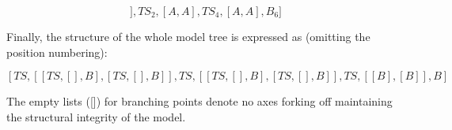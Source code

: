 \begin{equation}
[TS_0,[[A,A]],TS_2,[A,A],TS_4,[A,A],B_6]
\end{equation}

Finally,  the  structure of  the  whole  model  tree is  expressed  as
(omitting the position numbering):

\begin{equation}\label{eq:tree}
[TS,[[TS,[],B],[TS,[],B]],TS,[[TS,[],B],[TS,[],B]],TS,[[B],[B]],B]
\end{equation}

The empty lists  ([]) for branching points denote  no axes forking off
maintaining the structural integrity of the model.

